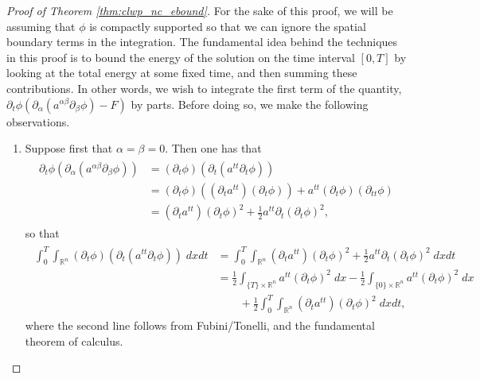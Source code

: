 \documentclass{article}
\begin{document}
\begin{proof}[Proof of Theorem \ref{thm:clwp_nc_ebound}]
	For the sake of this proof, we will be assuming that $\phi$ is compactly supported so that we can ignore the spatial boundary terms in the integration. The fundamental idea behind the techniques in this proof is to bound the energy of the solution on the time interval $[0,T]$ by looking at the total energy at some fixed time, and then summing these contributions. In other words, we wish to integrate the first term of the quantity, $\partial_{t}\phi(\partial_{\alpha}(a^{\alpha\beta}\partial_{\beta}\phi) - F)$ by parts. Before doing so, we make the following observations. 
	\begin{enumerate}[itemsep =-2pt,label = (\arabic{*})]
		\item Suppose first that $\alpha = \beta = 0$. Then one has that 
		\begin{align*}
			\begin{split}
				\partial_{t}\phi(\partial_{\alpha}(a^{\alpha\beta}\partial_{\beta}\phi)) &= (\partial_{t}\phi)(\partial_{t}(a^{tt}\partial_{t}\phi)) \\
				&= (\partial_{t}\phi)((\partial_{t}a^{tt})(\partial_{t}\phi)) + a^{tt}(\partial_{t}\phi)(\partial_{tt}\phi) \\
				&= (\partial_{t}a^{tt})(\partial_{t}\phi)^{2} + \frac{1}{2}a^{tt}\partial_{t}(\partial_{t}\phi)^{2}, 
			\end{split}
		\end{align*}
		so that 
		\begin{align*}
			\begin{split}
				\int_{0}^{T}\int_{\mathbb{R}^{n}}(\partial_{t}\phi)(\partial_{t}(a^{tt}\partial_{t}\phi))\;dxdt &= \int_{0}^{T}\int_{\mathbb{R}^{n}} (\partial_{t}a^{tt})(\partial_{t}\phi)^{2} + \frac{1}{2}a^{tt}\partial_{t}(\partial_{t}\phi)^{2}\;dx dt \\
				&= \frac{1}{2}\int_{\{T\} \times \mathbb{R}^{n}}a^{tt}(\partial_{t}\phi)^{2}\;dx - \frac{1}{2}\int_{\{0\} \times \mathbb{R}^{n}}a^{tt}(\partial_{t}\phi)^{2}\;dx \\
				&\qquad + \frac{1}{2}\int_{0}^{T}\int_{\mathbb{R}^{n}}(\partial_{t}a^{tt})(\partial_{t}\phi)^{2}\;dxdt, 
			\end{split}
		\end{align*}
		where the second line follows from Fubini/Tonelli, and the fundamental theorem of calculus. 
		

\end{enumerate}
\end{proof}
\end{document}
